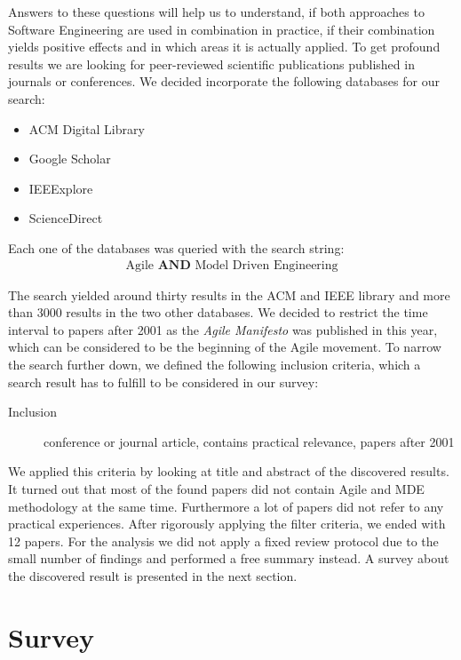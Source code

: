 \documentclass[10pt, a4paper, twocolumn]{article}
\begin{document}
Answers to these questions will help us to understand, if both approaches to Software Engineering are used in combination in practice, if their combination yields positive effects and in which areas it is actually applied. 
To get profound results we are looking for peer-reviewed scientific publications published in journals or conferences. 
We decided incorporate the following databases for our search:
\begin{itemize}
\item ACM Digital Library
\item Google Scholar
\item IEEExplore
\item ScienceDirect
\end{itemize}

Each one of the databases was queried with the search string:
\begin{align}
	\text{Agile } \textbf{AND} \text{ Model Driven Engineering}
\end{align}

The search yielded around thirty results in the ACM and IEEE library and more than 3000 results in the two other databases. 
We decided to restrict the time interval to papers after 2001 as the \emph{Agile Manifesto} \cite{secondaryAgileManifesto} was published in this year, which can be considered to be the beginning of the Agile movement.
To narrow the search further down, we defined the following inclusion criteria, which a search result has to fulfill to be considered in our survey:
\begin{description}
\item[Inclusion] conference or journal article, contains practical relevance, papers after 2001
\end{description}

We applied this criteria by looking at title and abstract of the discovered results. 
It turned out that most of the found papers did not contain Agile and MDE methodology at the same time.
Furthermore a lot of papers did not refer to any practical experiences.
After rigorously applying the filter criteria, we ended with 12 papers. 
For the analysis we did not apply a fixed review protocol due to the small number of findings and performed a free summary instead.
A survey about the discovered result is presented in the next section.

\section{Survey}
\label{sec:survey}
\end{document}
